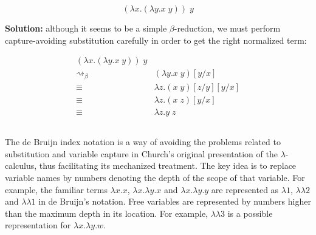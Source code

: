 \documentclass{article}
\begin{document}
$$(\lambda x.(\lambda y.x\;y))\;y$$

\textbf{Solution:} although it seems to be a simple $\beta$-reduction, 
we must perform capture-avoiding substitution carefully in order to 
get the right normalized term:

\begin{align*}
  (\lambda x.(\lambda y.x\;y))\;y \\
    \rightsquigarrow_\beta &(\lambda y.x\;y)[y/x] \\ 
    \equiv &\lambda z.(x\;y)[z/y][y/x] \\
    \equiv &\lambda z.(x\;z)[y/x] \\
    \equiv &\lambda z.y\;z
\end{align*}

\subsection{}\label{ex:3}

The de Bruijn index notation is a way of avoiding the problems 
related to substitution and variable capture in Church’s original 
presentation of the $\lambda$-calculus, thus facilitating its 
mechanized treatment. The key idea is to replace variable names 
by numbers denoting the depth of the scope of that variable. For 
example, the familiar terms $\lambda x.x$, $\lambda x.\lambda y.x$ 
and $\lambda x.\lambda y.y$ are represented as $\lambda1$, 
$\lambda\lambda 2$ and $\lambda\lambda 1$ in de Bruijn’s notation. 
Free variables are represented by numbers higher than the maximum
depth in its location. For example, $\lambda\lambda 3$ is a 
possible representation for $\lambda x.\lambda y.w$.
\end{document}
